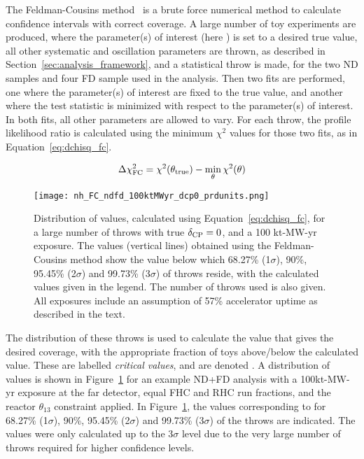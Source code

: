 The Feldman-Cousins method~\cite{Feldman:1997qc} is a brute force numerical method to calculate confidence intervals with correct coverage. A large number of toy experiments are produced, where the parameter(s) of interest (here \deltacp) is set to a desired true value, all other systematic and oscillation parameters are thrown, as described in Section~\ref{sec:analysis_framework}, and a statistical throw is made, for the two ND samples and four FD sample used in the analysis. Then two fits are performed, one where the parameter(s) of interest are fixed to the true value, and another where the test statistic is minimized with respect to the parameter(s) of interest. In both fits, all other parameters are allowed to vary. For each throw, the profile likelihood ratio \dchisqFC is calculated using the minimum $\chi^{2}$ values for those two fits, as in Equation~\ref{eq:dchisq_fc}.
\begin{linenomath*}
  \begin{equation}
    \Delta\chi^{2}_{\mathrm{FC}} = \chi^{2}(\theta_{\mathrm{true}}) - \min_{\theta}\chi^{2}(\theta)
    \label{eq:dchisq_fc}
  \end{equation}
\end{linenomath*}
\begin{figure}[htbp]
  \centering
  \texttt{[image: nh\_FC\_ndfd\_100ktMWyr\_dcp0\_prdunits.png]}
  \caption{Distribution of \dchisqFC values, calculated using Equation~\ref{eq:dchisq_fc}, for a large number of throws with true $\delta_{\rm CP} = 0$, and a 100 kt-MW-yr exposure. The \dchisqcrit values (vertical lines) obtained using the Feldman-Cousins method show the \dchisqFC value below which 68.27\% (1$\sigma$), 90\%, 95.45\% (2$\sigma$) and 99.73\% (3$\sigma$) of throws reside, with the calculated values given in the legend. The number of throws used is also given. All exposures include an assumption of 57\% accelerator uptime as described in the text.}
  \label{fig:fc_throws}
\end{figure}
The distribution of these throws is used to calculate the \dchisqFC value that gives the desired coverage, with the appropriate fraction of toys above/below the calculated value. These are labelled {\it critical values}, and are denoted \dchisqcrit. A distribution of \dchisqFC values is shown in Figure~\ref{fig:fc_throws} for an example ND+FD analysis with a 100kt-MW-yr exposure at the far detector, equal FHC and RHC run fractions, and the reactor $\theta_{13}$ constraint applied. In Figure~\ref{fig:fc_throws}, the \dchisqcrit values corresponding to for 68.27\% (1$\sigma$), 90\%, 95.45\% (2$\sigma$) and 99.73\% (3$\sigma$) of the throws are indicated. The \dchisqcrit values were only calculated up to the 3$\sigma$ level due to the very large number of throws required for higher confidence levels.

